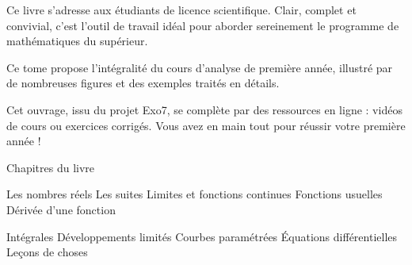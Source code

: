 
Ce livre s'adresse aux étudiants de licence scientifique. 
Clair, complet et convivial, c'est l'outil de travail idéal 
pour aborder sereinement le programme de mathématiques du supérieur. 

Ce tome propose l'intégralité du cours d'analyse de première année, 
illustré par de nombreuses figures et des exemples traités en détails.  
 
Cet ouvrage, issu du projet Exo7, se complète par des ressources en ligne : 
vidéos de cours ou exercices corrigés. Vous avez en main tout 
pour réussir votre première année !




Chapitres du livre 

Les nombres réels
Les suites
Limites et fonctions continues
Fonctions usuelles
Dérivée d’une fonction

Intégrales
Développements limités
Courbes paramétrées
Équations différentielles
Leçons de choses

